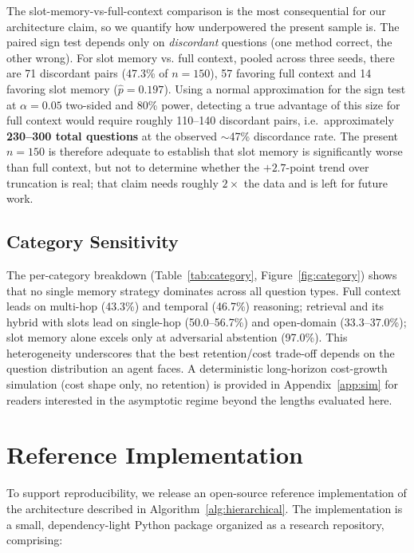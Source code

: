 \documentclass[conference]{IEEEtran}
\begin{document}
The slot-memory-vs-full-context comparison is the most consequential for
our architecture claim, so we quantify how underpowered the present sample
is. The paired sign test depends only on \emph{discordant} questions (one
method correct, the other wrong). For slot memory vs. full context, pooled
across three seeds, there are 71 discordant pairs (47.3\% of $n=150$), 57
favoring full context and 14 favoring slot memory ($\hat p = 0.197$). Using
a normal approximation for the sign test at $\alpha = 0.05$ two-sided and
80\% power, detecting a true advantage of this size for full context would
require roughly 110--140 discordant pairs, i.e.\ approximately
\textbf{230--300 total questions} at the observed $\sim$47\% discordance
rate. The present $n=150$ is therefore adequate to establish that slot
memory is significantly worse than full context, but not to determine
whether the $+2.7$-point trend over truncation is real; that claim needs
roughly $2\times$ the data and is left for future work.

\subsection{Category Sensitivity}
\label{sec:category}

The per-category breakdown (Table~\ref{tab:category}, Figure~\ref{fig:category})
shows that no single memory strategy dominates across all question types. Full
context leads on multi-hop (43.3\%) and temporal (46.7\%) reasoning; retrieval
and its hybrid with slots lead on single-hop (50.0--56.7\%) and open-domain
(33.3--37.0\%); slot memory alone excels only at adversarial abstention (97.0\%).
This heterogeneity underscores that the best retention/cost trade-off depends on
the question distribution an agent faces. A deterministic long-horizon cost-growth simulation (cost shape
only, no retention) is provided in Appendix~\ref{app:sim} for readers
interested in the asymptotic regime beyond the lengths evaluated here.

\section{Reference Implementation}
\label{sec:implementation}

To support reproducibility, we release an open-source reference implementation of the architecture described in Algorithm~\ref{alg:hierarchical}. The implementation is a small, dependency-light Python package organized as a research repository, comprising:
\end{document}
